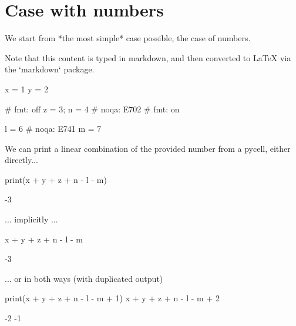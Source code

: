 \documentclass[oneside]{book}
\begin{document}
\chapter{Case with numbers}

\begin{mdcell}
We start from *the most simple* case possible, the case of numbers.

Note that this content is typed in markdown, and then converted to LaTeX via the `markdown` package.
\end{mdcell}

\begin{pycell}
x = 1
y = 2
\end{pycell}

\begin{pycell}
# fmt: off
z = 3; n = 4  # noqa: E702
# fmt: on
\end{pycell}

\begin{pycell}
l = 6  # noqa: E741
m = 7
\end{pycell}

\begin{mdcell}
We can print a linear combination of the provided number from a pycell, either directly...
\end{mdcell}

\begin{pycell}
print(x + y + z + n - l - m)
\end{pycell}
\begin{pyexpectedoutput}
-3
\end{pyexpectedoutput}

\begin{mdcell}
... implicitly ...
\end{mdcell}

\begin{pycell}
x + y + z + n - l - m
\end{pycell}
\begin{pyexpectedoutput}
-3
\end{pyexpectedoutput}

\begin{mdcell}
... or in both ways (with duplicated output)
\end{mdcell}

\begin{pycell}
print(x + y + z + n - l - m + 1)
x + y + z + n - l - m + 2
\end{pycell}
\begin{pyexpectedoutput}
-2
-1
\end{pyexpectedoutput}
\end{document}
